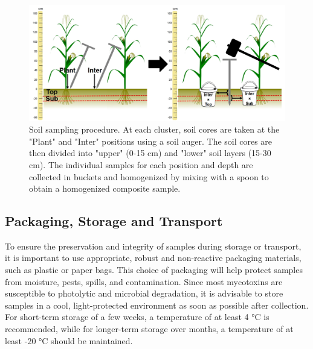 \begin{refsection}
\begin{figure}[h]
\centering
\includegraphics[width=1\textwidth]{figures/sop_soil sampling 2.jpg}
\decoRule
\captionsetup{labelfont=bf, justification=justified, singlelinecheck=false, width=1\textwidth}
\caption{Soil sampling procedure. At each cluster, soil cores are taken at the "Plant" and "Inter" positions using a soil auger. The soil cores are then divided into "upper" (0-15 cm) and "lower" soil layers (15-30 cm). The individual samples for each position and depth are collected in buckets and homogenized by mixing with a spoon to obtain a homogenized composite sample.}
\label{fig:SOP2}
\end{figure}

\subsection*{Packaging, Storage and Transport}

To ensure the preservation and integrity of samples during storage or transport, it is important to use appropriate, robust and non-reactive packaging materials, such as plastic or paper bags. This choice of packaging will help protect samples from moisture, pests, spills, and contamination. Since most mycotoxins are susceptible to photolytic and microbial degradation, it is advisable to store samples in a cool, light-protected environment as soon as possible after collection. For short-term storage of a few weeks, a temperature of at least 4 °C is recommended, while for longer-term storage over months, a temperature of at least -20 °C should be maintained.


\end{refsection}
